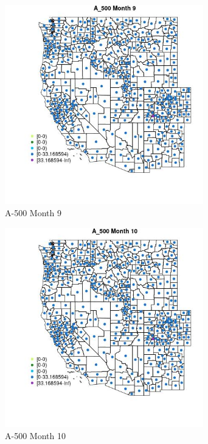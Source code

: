 \begin{figure} 
\centering  
\includegraphics[width=0.77\textwidth]{Code_Outputs/df_report_ML_predictors_CountyCentroid_Locations_Dates_2008-01-01to2018-12-31_MapObsMo9A_500.jpg} 
\caption{\label{fig:df_report_ML_predictors_CountyCentroid_Locations_Dates_2008-01-01to2018-12-31MapObsMo9A_500}A-500 Month 9} 
\end{figure} 
 

\clearpage 

\begin{figure} 
\centering  
\includegraphics[width=0.77\textwidth]{Code_Outputs/df_report_ML_predictors_CountyCentroid_Locations_Dates_2008-01-01to2018-12-31_MapObsMo10A_500.jpg} 
\caption{\label{fig:df_report_ML_predictors_CountyCentroid_Locations_Dates_2008-01-01to2018-12-31MapObsMo10A_500}A-500 Month 10} 
\end{figure} 
 

